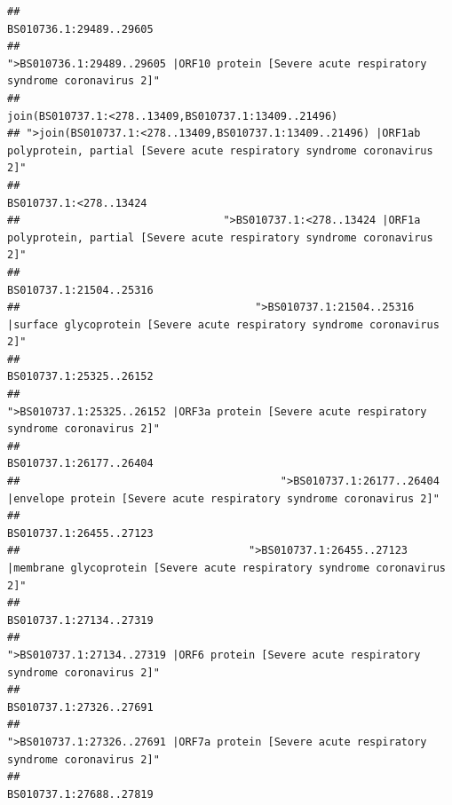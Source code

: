 \documentclass[
]{article}
\begin{document}
\begin{verbatim}
##                                                                                                                BS010736.1:29489..29605 
##                                            ">BS010736.1:29489..29605 |ORF10 protein [Severe acute respiratory syndrome coronavirus 2]" 
##                                                                                   join(BS010737.1:<278..13409,BS010737.1:13409..21496) 
## ">join(BS010737.1:<278..13409,BS010737.1:13409..21496) |ORF1ab polyprotein, partial [Severe acute respiratory syndrome coronavirus 2]" 
##                                                                                                                 BS010737.1:<278..13424 
##                                ">BS010737.1:<278..13424 |ORF1a polyprotein, partial [Severe acute respiratory syndrome coronavirus 2]" 
##                                                                                                                BS010737.1:21504..25316 
##                                     ">BS010737.1:21504..25316 |surface glycoprotein [Severe acute respiratory syndrome coronavirus 2]" 
##                                                                                                                BS010737.1:25325..26152 
##                                            ">BS010737.1:25325..26152 |ORF3a protein [Severe acute respiratory syndrome coronavirus 2]" 
##                                                                                                                BS010737.1:26177..26404 
##                                         ">BS010737.1:26177..26404 |envelope protein [Severe acute respiratory syndrome coronavirus 2]" 
##                                                                                                                BS010737.1:26455..27123 
##                                    ">BS010737.1:26455..27123 |membrane glycoprotein [Severe acute respiratory syndrome coronavirus 2]" 
##                                                                                                                BS010737.1:27134..27319 
##                                             ">BS010737.1:27134..27319 |ORF6 protein [Severe acute respiratory syndrome coronavirus 2]" 
##                                                                                                                BS010737.1:27326..27691 
##                                            ">BS010737.1:27326..27691 |ORF7a protein [Severe acute respiratory syndrome coronavirus 2]" 
##                                                                                                                BS010737.1:27688..27819 

\end{verbatim}
\end{document}
